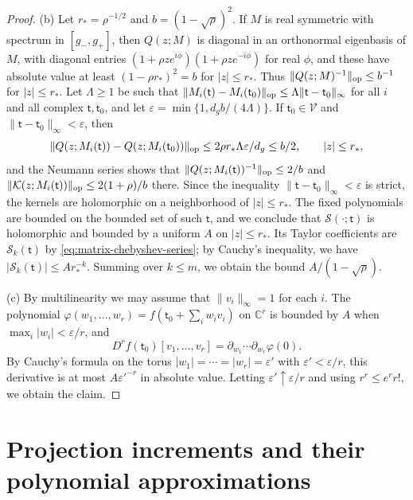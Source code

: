 \begin{proof}
(b) Let $r_*=\rho^{-1/2}$ and $b=(1-\sqrt\rho)^2$. If $M$ is real
symmetric with spectrum in $[g_-,g_+]$, then $Q(z;M)$ is diagonal in an
orthonormal eigenbasis of $M$, with diagonal entries
$(1+\rho ze^{i\phi})(1+\rho ze^{-i\phi})$ for real $\phi$, and these have
absolute value at least $(1-\rho r_*)^2=b$ for $|z|\le r_*$. Thus
$\|Q(z;M)^{-1}\|_{\rm op}\le b^{-1}$ for $|z|\le r_*$. Let $\Lambda\ge1$ be
such that
$\|M_i(\mathsf t)-M_i(\mathsf t_0)\|_{\rm op}\le\Lambda\|\mathsf t-\mathsf t_0\|_\infty$
for all $i$ and all complex $\mathsf t,\mathsf t_0$, and let
$\varepsilon=\min\{1,d_gb/(4\Lambda)\}$. If $\mathsf t_0\in\mathcal V$ and
$\|\mathsf t-\mathsf t_0\|_\infty<\varepsilon$, then
\[
 \|Q(z;M_i(\mathsf t))-Q(z;M_i(\mathsf t_0))\|_{\rm op}
 \le2\rho r_*\Lambda\varepsilon/d_g\le b/2,\qquad |z|\le r_*,
\]
and the Neumann series shows that $\|Q(z;M_i(\mathsf t))^{-1}\|_{\rm op}\le2/b$
and $\|\mathcal K(z;M_i(\mathsf t))\|_{\rm op}\le2(1+\rho)/b$ there. Since the
inequality $\|\mathsf t-\mathsf t_0\|_\infty<\varepsilon$ is strict, the
kernels are holomorphic on a neighborhood of $|z|\le r_*$. The fixed
polynomials are bounded on the bounded set of such $\mathsf t$, and we
conclude that $\mathcal S(\cdot;\mathsf t)$ is holomorphic and bounded by a uniform $A$
on $|z|\le r_*$. Its Taylor coefficients are $\mathcal S_k(\mathsf t)$ by
\eqref{eq:matrix-chebyshev-series}; by Cauchy's inequality, we have
$|\mathcal S_k(\mathsf t)|\le Ar_*^{-k}$. Summing over
$k\le m$, we obtain the bound $A/(1-\sqrt\rho)$.

(c) By multilinearity we may assume that $\|v_i\|_\infty=1$ for each $i$.
The polynomial $\varphi(w_1,\ldots,w_r)=f(\mathsf t_0+\sum_iw_iv_i)$ on
$\mathbb C^r$ is bounded by $A$ when $\max_i|w_i|<\varepsilon/r$, and
\[
 D^rf(\mathsf t_0)[v_1,\ldots,v_r]=\partial_{w_1}\cdots\partial_{w_r}\varphi(0).
\]
By Cauchy's formula on the torus $|w_1|=\cdots=|w_r|=\varepsilon'$ with
$\varepsilon'<\varepsilon/r$, this derivative is at most
$A\varepsilon'^{-r}$ in absolute value. Letting
$\varepsilon'\uparrow\varepsilon/r$ and using $r^r\le e^rr!$, we obtain
the claim.
\end{proof}

\section{Projection increments and their polynomial approximations}
\label{sec:increments}

